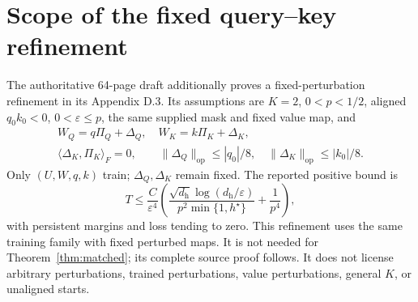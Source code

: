 \section{Scope of the fixed query--key refinement}\label{app:robustness}
The authoritative 64-page draft additionally proves a fixed-perturbation refinement in its Appendix D.3. Its assumptions are $K=2$, $0<p<1/2$, aligned $q_0k_0<0$, $0<\varepsilon\le p$, the same supplied mask and fixed value map, and
\begin{equation}\label{eq:planted-perturbation}
\begin{gathered} W_Q=q\Pi_Q+\Delta_Q,\quad W_K=k\Pi_K+\Delta_K,\\
\langle\Delta_K,\Pi_K\rangle_F=0,\qquad
\|\Delta_Q\|_{\mathrm{op}}\le|q_0|/8,\quad
\|\Delta_K\|_{\mathrm{op}}\le|k_0|/8.\end{gathered}
\end{equation}
Only $(U,W,q,k)$ train; $\Delta_Q,\Delta_K$ remain fixed. The reported positive bound is
\[
T\le\frac C{\varepsilon^4}\left(
\frac{\sqrt{d_{\mathrm h}}\log(d_{\mathrm h}/\varepsilon)}{p^2\min\{1,h^\star\}}
+\frac1{p^4}\right),
\]
with persistent margins and loss tending to zero. This refinement uses the same training family with fixed perturbed maps. It is not needed for Theorem~\ref{thm:matched}; its complete source proof follows. It does not license arbitrary perturbations, trained perturbations, value perturbations, general $K$, or unaligned starts. 



